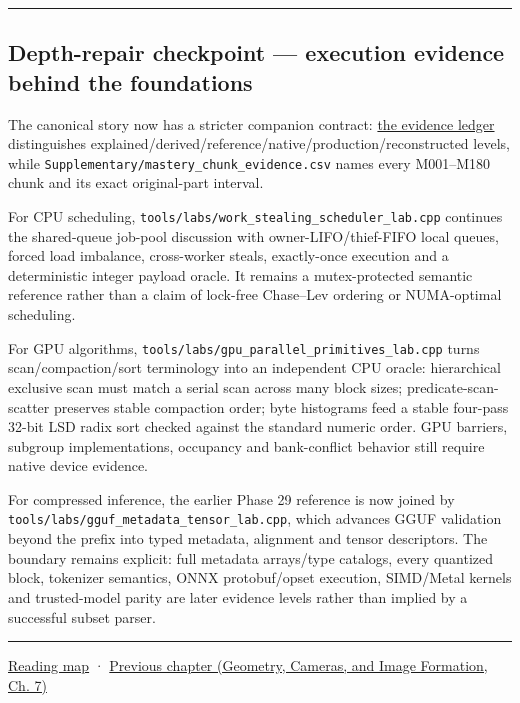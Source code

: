 \begin{center}\rule{0.5\linewidth}{0.5pt}\end{center}

\subsection{Depth-repair checkpoint --- execution evidence behind the foundations}\label{02-foundations-ii-ch039-depth-repair-checkpoint-execution-evidence-behind-the-foundations}

The canonical story now has a stricter companion contract: \hyperref[appendix-2358b21a702d]{the evidence ledger} distinguishes explained/derived/reference/native/production/reconstructed levels, while \texttt{Supplementary/mastery\_chunk\_evidence.csv} names every M001--M180 chunk and its exact original-part interval.

For CPU scheduling, \texttt{tools/labs/work\_stealing\_scheduler\_lab.cpp} continues the shared-queue job-pool discussion with owner-LIFO/thief-FIFO local queues, forced load imbalance, cross-worker steals, exactly-once execution and a deterministic integer payload oracle. It remains a mutex-protected semantic reference rather than a claim of lock-free Chase--Lev ordering or NUMA-optimal scheduling.

For GPU algorithms, \texttt{tools/labs/gpu\_parallel\_primitives\_lab.cpp} turns scan/compaction/sort terminology into an independent CPU oracle: hierarchical exclusive scan must match a serial scan across many block sizes; predicate-scan-scatter preserves stable compaction order; byte histograms feed a stable four-pass 32-bit LSD radix sort checked against the standard numeric order. GPU barriers, subgroup implementations, occupancy and bank-conflict behavior still require native device evidence.

For compressed inference, the earlier Phase 29 reference is now joined by \texttt{tools/labs/gguf\_metadata\_tensor\_lab.cpp}, which advances GGUF validation beyond the prefix into typed metadata, alignment and tensor descriptors. The boundary remains explicit: full metadata arrays/type catalogs, every quantized block, tokenizer semantics, ONNX protobuf/opset execution, SIMD/Metal kernels and trusted-model parity are later evidence levels rather than implied by a successful subset parser.

\begin{center}\rule{0.5\linewidth}{0.5pt}\end{center}

\hyperref[volume-reading-map]{Reading map} · \href{../03-Geometry-Cameras-and-Image-Formation/main.pdf\#nameddest=02-foundations-ii-ch038-reconstruct-the-complete-geometry-pipeline}{Previous chapter (Geometry, Cameras, and Image Formation, Ch. 7)}
